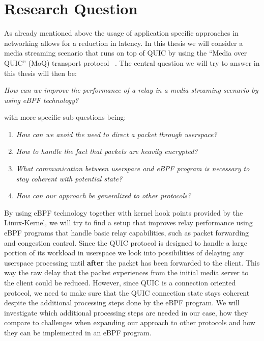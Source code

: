 \section{Research Question}\label{sec:research_question}

As already mentioned above the usage of application specific approaches in networking allows for a reduction in latency.
In this thesis we will consider a media streaming scenario that runs on top of QUIC by using the ``Media over QUIC'' (MoQ) transport protocol
~\parencite{draft-moqtransport}.
The central question we will try to answer in this thesis will then be:
\vspace{0.5cm}
\begin{center}
    \textit{How can we improve the performance of a relay in a media streaming scenario by using eBPF technology?}
\end{center}
\vspace{0.5cm}
with more specific sub-questions being:
\vspace{0.5cm}
\begin{enumerate}
    \item \textit{How can we avoid the need to direct a packet through userspace?}
    \item \textit{How to handle the fact that packets are heavily encrypted?}
    \item \textit{What communication between userspace and eBPF program is necessary to stay coherent with potential state?}
    \item \textit{How can our approach be generalized to other protocols?}
\end{enumerate}
\vspace{0.5cm}
By using eBPF technology together with kernel hook points provided by the Linux-Kernel, we will try to find a setup that improves relay 
performance using eBPF programs that handle basic relay capabilities, such as packet forwarding and congestion control.
Since the QUIC protocol is designed to handle a large portion of its workload in userspace we look into possibilities of delaying any 
userspace processing until \textbf{after} the packet has been forwarded to the client.
This way the raw delay that the packet experiences from the initial media server to the client could be reduced. 
However, since QUIC is a connection oriented protocol, we need to make sure that the QUIC connection state stays 
coherent despite the additional processing steps done by the eBPF program.
We will investigate which additional processing steps are needed in our case, how they compare to challenges when expanding our approach to other
protocols and how they can be implemented in an eBPF program.

